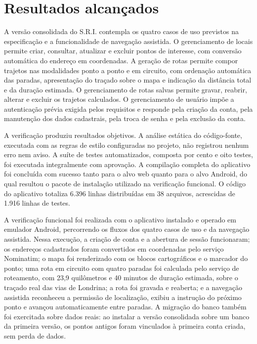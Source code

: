 \section{Resultados alcançados}

A versão consolidada do S.R.I. contempla os quatro casos de uso previstos na especificação e a funcionalidade de navegação assistida. O gerenciamento de locais permite criar, consultar, atualizar e excluir pontos de interesse, com conversão automática do endereço em coordenadas. A geração de rotas permite compor trajetos nas modalidades ponto a ponto e em circuito, com ordenação automática das paradas, apresentação do traçado sobre o mapa e indicação da distância total e da duração estimada. O gerenciamento de rotas salvas permite gravar, reabrir, alterar e excluir os trajetos calculados. O gerenciamento de usuário impõe a autenticação prévia exigida pelos requisitos e responde pela criação da conta, pela manutenção dos dados cadastrais, pela troca de senha e pela exclusão da conta.

A verificação produziu resultados objetivos. A análise estática do código-fonte, executada com as regras de estilo configuradas no projeto, não registrou nenhum erro nem aviso. A suíte de testes automatizados, composta por cento e oito testes, foi executada integralmente com aprovação. A compilação completa do aplicativo foi concluída com sucesso tanto para o alvo web quanto para o alvo Android, do qual resultou o pacote de instalação utilizado na verificação funcional. O código do aplicativo totaliza 6.396 linhas distribuídas em 38 arquivos, acrescidas de 1.916 linhas de testes.

A verificação funcional foi realizada com o aplicativo instalado e operado em emulador Android, percorrendo os fluxos dos quatro casos de uso e da navegação assistida. Nessa execução, a criação de conta e a abertura de sessão funcionaram; os endereços cadastrados foram convertidos em coordenadas pelo serviço Nominatim; o mapa foi renderizado com os blocos cartográficos e o marcador do ponto; uma rota em circuito com quatro paradas foi calculada pelo serviço de roteamento, com 23,9 quilômetros e 40 minutos de duração estimada, sobre o traçado real das vias de Londrina; a rota foi gravada e reaberta; e a navegação assistida reconheceu a permissão de localização, exibiu a instrução do próximo ponto e avançou automaticamente entre paradas. A migração do banco também foi exercitada sobre dados reais: ao instalar a versão consolidada sobre um banco da primeira versão, os pontos antigos foram vinculados à primeira conta criada, sem perda de dados.

